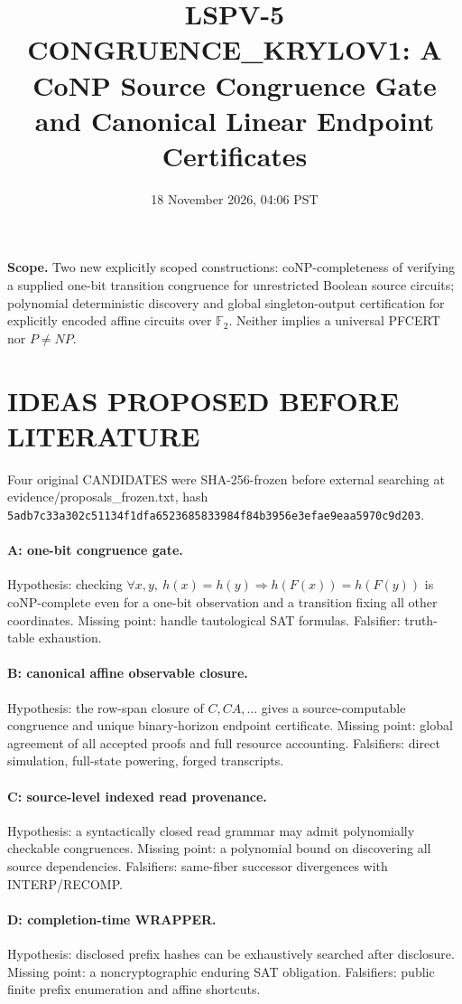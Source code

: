 \documentclass[11pt]{article}
\title{LSPV-5 CONGRUENCE\_KRYLOV1: A CoNP Source Congruence Gate and Canonical Linear Endpoint Certificates}
\date{18 November 2026, 04:06 PST}
\begin{document}
\maketitle
\noindent\textbf{Scope.} Two new explicitly scoped constructions: coNP-completeness of verifying a supplied one-bit transition congruence for unrestricted Boolean source circuits; polynomial deterministic discovery and global singleton-output certification for explicitly encoded affine circuits over $\mathbb F_2$. Neither implies a universal PFCERT nor $P\ne NP$.
\section{IDEAS PROPOSED BEFORE LITERATURE}
Four original CANDIDATES were SHA-256-frozen before external searching at evidence/proposals\_frozen.txt, hash \texttt{5adb7c33a302c51134f1dfa6523685833984f84b3956e3efae9eaa5970c9d203}.
\paragraph{A: one-bit congruence gate.} Hypothesis: checking $\forall x,y,\ h(x)=h(y)\Rightarrow h(F(x))=h(F(y))$ is coNP-complete even for a one-bit observation and a transition fixing all other coordinates. Missing point: handle tautological SAT formulas. Falsifier: truth-table exhaustion.
\paragraph{B: canonical affine observable closure.} Hypothesis: the row-span closure of $C,CA,\ldots$ gives a source-computable congruence and unique binary-horizon endpoint certificate. Missing point: global agreement of all accepted proofs and full resource accounting. Falsifiers: direct simulation, full-state powering, forged transcripts.
\paragraph{C: source-level indexed read provenance.} Hypothesis: a syntactically closed read grammar may admit polynomially checkable congruences. Missing point: a polynomial bound on discovering all source dependencies. Falsifiers: same-fiber successor divergences with INTERP/RECOMP.
\paragraph{D: completion-time WRAPPER.} Hypothesis: disclosed prefix hashes can be exhaustively searched after disclosure. Missing point: a noncryptographic enduring SAT obligation. Falsifiers: public finite prefix enumeration and affine shortcuts.
\end{document}
